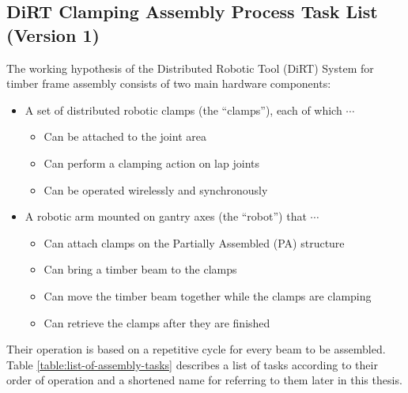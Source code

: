 \subsection{DiRT Clamping Assembly Process Task List (Version 1)}
\label{subsection:exploration-1-dirt-clamping-assembly-process-task-list-v1}

The working hypothesis of the Distributed Robotic Tool (DiRT) System for timber frame assembly consists of two main hardware components:
\begin{itemize}[nosep]
    \item A set of distributed robotic clamps (the “clamps”), each of which $\cdots$
    \begin{itemize}
        \item Can be attached to the joint area
        \item Can perform a clamping action on lap joints
        \item Can be operated wirelessly and synchronously
    \end{itemize}
    \item A robotic arm mounted on gantry axes (the “robot”) that $\cdots$
    \begin{itemize}
        \item Can attach clamps on the Partially Assembled (PA) structure
        \item Can bring a timber beam to the clamps
        \item Can move the timber beam together while the clamps are clamping
        \item Can retrieve the clamps after they are finished
    \end{itemize}
\end{itemize}

Their operation is based on a repetitive cycle for every beam to be assembled. Table \ref{table:list-of-assembly-tasks} describes a list of tasks according to their order of operation and a shortened name for referring to them later in this thesis.

